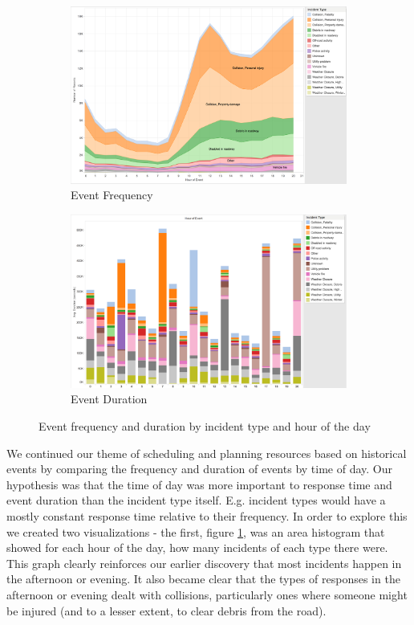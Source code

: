 \documentclass[11pt,letterpaper]{article}
\begin{document}
\begin{figure}[h]
	\centering
	\begin{subfigure}{0.49\textwidth}
		\centering
		\includegraphics[width=\textwidth]{figures/event_frequency.png}
		\caption{\textsf{Event Frequency}}
        \label{fig:event_frequency}
	\end{subfigure} \hfill
	\begin{subfigure}{0.49\textwidth}
		\centering
		\includegraphics[width=\textwidth]{figures/event_duration.png}
		\caption{Event Duration}
        \label{fig:event_duration}
	\end{subfigure}
    \caption{\textsf{Event frequency and duration by incident type and hour of the day}}
    \label{fig:incident_analysis}
\end{figure}

We continued our theme of scheduling and planning resources based on historical events by comparing the frequency and duration of events by time of day. Our hypothesis was that the time of day was more important to response time and event duration than the incident type itself. E.g. incident types would have a mostly constant response time relative to their frequency. In order to explore this we created two visualizations - the first, figure \ref{fig:event_frequency}, was an area histogram that showed for each hour of the day, how many incidents of each type there were. This graph clearly reinforces our earlier discovery that most incidents happen in the afternoon or evening. It also became clear that the types of responses in the afternoon or evening dealt with collisions, particularly ones where someone might be injured (and to a lesser extent, to clear debris from the road). 
\end{document}
